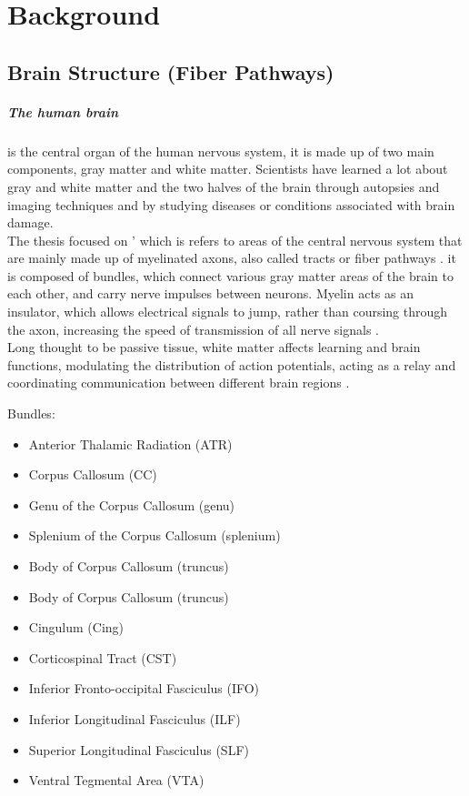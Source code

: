 \documentclass[../structure.tex]{subfiles}
\begin{document}
\chapter{Background}
\section{Brain Structure (Fiber Pathways)}
	\paragraph{The human brain} is the central organ of the human nervous system, it is made up of two main components, gray matter and white matter. Scientists have learned a lot about gray and white matter and the two halves of the brain through autopsies and imaging techniques and by studying diseases or conditions associated with brain damage.
	\\The thesis focused on ' which is refers to areas of the central nervous system that are mainly made up of myelinated axons, also called tracts or fiber pathways \cite{Blumenfeld2010}. it is composed of bundles, which connect various gray matter areas of the brain to each other, and carry nerve impulses between neurons. Myelin acts as an insulator, which allows electrical signals to jump, rather than coursing through the axon, increasing the speed of transmission of all nerve signals \cite{Klein2008}.
	\\Long thought to be passive tissue, white matter affects learning and brain functions, modulating the distribution of action potentials, acting as a relay and coordinating communication between different brain regions \cite{Fields2008}.
	
	Bundles:
    \begin{itemize}
        \item Anterior Thalamic Radiation (ATR)
        \item Corpus Callosum (CC)
        \item Genu of the Corpus Callosum (genu)
        \item Splenium of the Corpus Callosum (splenium)
        \item Body of Corpus Callosum (truncus)
        \item Body of Corpus Callosum (truncus)
		\item Cingulum (Cing)
		\item Corticospinal Tract (CST)
		\item Inferior Fronto-occipital Fasciculus (IFO)
		\item Inferior Longitudinal Fasciculus (ILF)
		\item Superior Longitudinal Fasciculus (SLF)
		\item Ventral Tegmental Area (VTA)
	\end{itemize}
\end{document}
